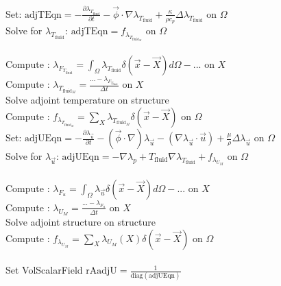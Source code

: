 \documentclass[10pt]{article} %
\begin{document}
\begin{center}
	\newpage
\begin{algorithm}[H]
	\SetAlgoLined
	{
		{
			Set: $\text{adjTEqn} = - \frac{\partial \lambda_{T_{\text{fluid}}}}{\partial t} -\vec{\phi} \cdot \nabla \lambda_{T_{\text{fluid}}} + \frac{\kappa}{\rho c_p} \Delta  \lambda_{T_{\text{fluid}}}$ \quad on $\Omega$\\
			Solve for $\lambda_{T_{\text{fluid}}}$: $\text{adjTEqn} = f_{\lambda_{T_{\text{fluid}_M}}} $ \quad on $\Omega$\\
			\quad \\
			Compute : $\lambda_{F_{T_{\text{fluid}}}} = \int_{\Omega} \lambda_{T_{\text{fluid}}} \delta (\vec{x}-\vec{X}) d\Omega - ... $ \quad on $X$\\
			Compute : $\lambda_{T_{\text{fluid}_M}} = \frac{... - \lambda_{F_{T_{\text{fluid}}}}}{\Delta t}$ \quad on $X$\\
			Solve adjoint temperature on structure\\
			Compute : $f_{\lambda_{T_{\text{fluid}_M}}} = \sum_{X} \lambda_{T_{\text{fluid}_M}} \delta (\vec{x}-\vec{X})$ \quad on $\Omega$\\
		}
		{
			Set: $\text{adjUEqn} = -\frac{\partial \lambda_{\vec{u}}}{\partial t}-(\vec{\phi}\cdot\nabla) \lambda_{\vec{u}} - \left(\nabla \lambda_{\vec{u}} \cdot \vec{u}\right) + \frac{\mu}{\rho} \Delta \lambda_{\vec{u}}$ \quad on $\Omega$\\
			Solve for $\lambda_{\vec{u}}$: $\text{adjUEqn} = - \nabla\lambda_p + T_{\text{fluid}} \nabla \lambda_{T_{\text{fluid}}} + f_{\lambda_{U_M}}$ \quad on $\Omega$\\
			\quad \\
			Compute : $\lambda_{F_u} = \int_{\Omega} \lambda_{\vec{u}} \delta (\vec{x}-\vec{X}) d\Omega - ...$  \quad on $X$\\
			Compute : $\lambda_{U_M} = \frac{...-\lambda_{F_u}}{\Delta t}$ \quad on $X$\\
			Solve adjoint structure on structure\\
			Compute : $f_{\lambda_{U_M}} = \sum_X \lambda_{U_M}(X) \delta(\vec{x}-\vec{X})$ \quad on $\Omega$\\
			\quad \\
			{
				Set VolScalarField $\text{rAadjU} =  \frac{1}{\text{diag}(\text{adjUEqn})}$\\
}}}
\end{algorithm}
\end{center}
\end{document}
